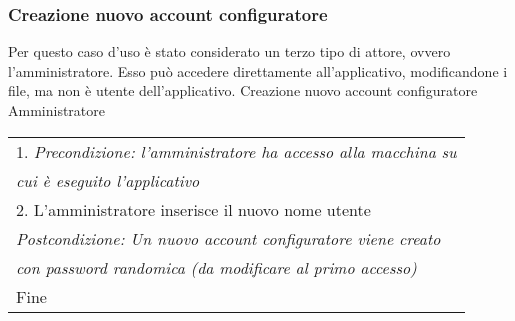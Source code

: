 \begin{minipage}{\textwidth}
    \subsubsection{Creazione nuovo account configuratore}
    Per questo caso d'uso è stato considerato un terzo tipo di attore, ovvero
    l'amministratore. Esso può accedere direttamente all'applicativo, modificandone
    i file, ma non è utente dell'applicativo.
    \usecase
        {Creazione nuovo account configuratore}
        {Amministratore}
        {
            \begin{tabular}{l}
                1. \textit{Precondizione: l'amministratore ha accesso alla macchina su}\\
                \textit{cui è eseguito l'applicativo}\\
                2. L'amministratore inserisce il nuovo nome utente\\
                \textit{Postcondizione: Un nuovo account configuratore viene creato} \\
                \textit{con password randomica (da modificare al primo accesso)}\\
                Fine
            \end{tabular} \\
        }
        \vspace{0.5cm}
\end{minipage}